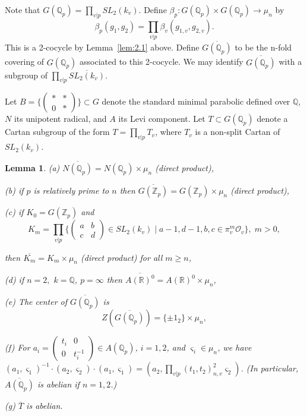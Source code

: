 \documentclass[12pt]{article}
\numberwithin{equation}{section}
\newtheorem{lemma}[theorem]{Lemma}
\def\qqq{\mathbb{Q}}
\begin{document}
Note that $G(\qqq_p)=\prod_{v|p}SL_2(k_v)$. Define 
$\beta _p:G(\qqq_p)\times G(\qqq_p)\rightarrow \mu _n$ by 
\[
\beta _p(g_1,g_2)=\prod_{v|p}\beta _v(g_{1,v},g_{2,v}).  
\]
This is a 2-cocycle by Lemma~\ref{lem:2.1} above. Define
$\overline{G(\qqq_p)}$ to be
the n-fold covering of $G(\qqq_p)$ associated to this 2-cocycle. We may
identify $\overline{G(\qqq_p)}$ with a subgroup of 
$\prod_{v|p}\overline{SL_2(k_v)}$.

Let $B=\{\left( 
\begin{array}{cc}
\ast & * \\ 
0 & *
\end{array}
\right) \}\subset G$ denote the standard minimal parabolic
defined over $\qqq$, $N$ its unipotent radical, and
$A$ its Levi component. Let
$T\subset G(\qqq_p)$ denote a Cartan subgroup of the form
$T=\prod_{v|p}T_v$, where $T_v$ is a non-split
Cartan of $SL_2(k_v)$.

\begin{lemma}\label{lem:2.3}
(a) $\overline{N(\qqq_p)}=N(\qqq_p)\times \mu _n$ (direct product),

(b) if $p$ is relatively prime to $n$
then $\overline{G({\mathbb{Z}}_p)}=G({\mathbb{Z}}_p)\times \mu _n$ (direct product),

(c) if $K_0=G({\mathbb{Z}}_p)$ and 
\[
K_m=\prod_{v|p}\{\left( 
\begin{array}{cc}
a & b \\ 
c & d
\end{array}
\right) \in SL_2(k_v)\;|\;a-1,d-1,b,c\in \pi _v^m{\mathcal{O}}_v\},\;m>0,
\]

then $\overline{K_m}=K_m\times \mu _n$ (direct product) for all $m\geq n$,

(d) if $n=2,$ $k=\qqq$, $p=\infty $ then 
$\overline{A({\mathbb R})^0}=A({\mathbb R})^0 \times \mu _n$,

(e) The center of $\overline{G(\qqq_p)}$ is 
\[
Z(\overline{G(\qqq_p)})=
\{\pm 1_2\}\times \mu _n,
\]

(f) For $a_i=\left( 
\begin{array}{cc}
t_i & 0 \\ 
0 & t_i^{-1}
\end{array}
\right) \in A(\qqq_p)$, $i=1,2$, and $\varsigma _i\in \mu _n$, we have $%
(a_1,\varsigma _1)^{-1}\cdot (a_2,\varsigma _2)\cdot (a_1,\varsigma
_1)=(a_2,\prod_{v|p}(t_1,t_2)_{n,v}^2\varsigma _2)$.
(In particular, $\overline{A(\qqq_p)}$ is abelian if $n=1,2$.)

(g) $\overline{T}$ is abelian.
\end{lemma}
\end{document}
